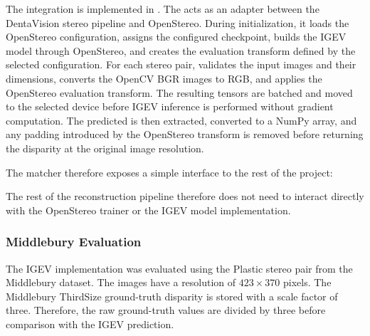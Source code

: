 The integration is implemented in
. The  acts as an
adapter between the DentaVision stereo pipeline and OpenStereo. During
initialization, it loads the OpenStereo configuration, assigns the configured
checkpoint, builds the IGEV model through OpenStereo, and creates the
evaluation transform defined by the selected configuration.
For each stereo pair,  validates the input images and their
dimensions, converts the OpenCV BGR images to RGB, and applies the OpenStereo
evaluation transform. The resulting tensors are batched and moved to the
selected device before IGEV inference is performed without gradient
computation. The predicted  is then extracted, converted to a
 NumPy array, and any padding introduced by the OpenStereo
transform is removed before returning the disparity at the original image
resolution.


The matcher therefore exposes a simple interface to the rest of the project:

\begin{center}
\end{center}

The rest of the reconstruction pipeline therefore does not need to interact
directly with the OpenStereo trainer or the IGEV model implementation.


\subsubsection{Middlebury Evaluation}

The IGEV implementation was evaluated using the Plastic stereo pair from the
Middlebury dataset. The images have a resolution of $423 \times 370$ pixels.
The Middlebury ThirdSize ground-truth disparity is stored with a scale factor
of three. Therefore, the raw ground-truth values are divided by three before
comparison with the IGEV prediction.


